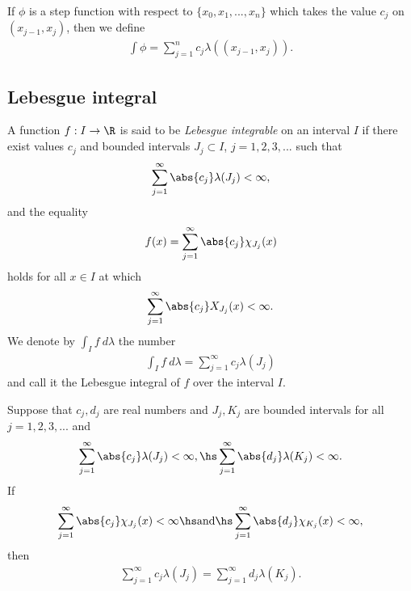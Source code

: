 \documentclass{article}
\begin{document}
\begin{definition}
	\label{step_integration}
	If $\phi$ is a step function with respect to $\{x_0, x_1, ..., x_n\}$ which takes the
	value $c_j$ on $(x_{j-1}, x_j)$, then we define
	\begin{align*}
		\int \phi = \sum_{j=1}^n c_j\lambda((x_{j-1},x_j)).
	\end{align*}
\end{definition}

\subsection{Lebesgue integral}

\begin{definition}
	\label{lebesgue}
	A function $f:I\to\R$ is said to be \emph{Lebesgue integrable} on an interval
	$I$ if there exist values $c_j$ and bounded intervals $J_j\subset I$, $j=1,2,3,...$
	such that
	\begin{align*}
		\sum_{j=1}^\infty \abs{c_j}\lambda (J_j) < \infty,
	\end{align*}
	and the equality
	\begin{align*}
		f(x) = \sum_{j=1}^\infty \abs{c_j}\chi_{J_j}(x)
	\end{align*}
	holds for all $x\in I$ at which
	\begin{align*}
		\sum_{j=1}^\infty \abs{c_j} X_{J_j}(x) < \infty.
	\end{align*}
	We denote by $\int_I f\:d\lambda$ the number
	\begin{align*}
		\int_I f\:d\lambda = \sum_{j=1}^\infty c_j\lambda(J_j)
	\end{align*}
	and call it the Lebesgue integral of $f$ over the interval $I$.
\end{definition}

\begin{theorem}[Notes 4.1]
	Suppose that $c_j,d_j$ are real numbers and $J_j,K_j$ are bounded intervals
	for all $j=1,2,3,...$ and
	\begin{align*}
		\sum_{j=1}^\infty \abs{c_j}\lambda(J_j)<\infty, \hs
		\sum_{j=1}^\infty \abs{d_j}\lambda(K_j)<\infty.
	\end{align*}
	If
	\begin{align*}
		\sum_{j=1}^\infty \abs{c_j}\chi_{J_j}(x) < \infty\hs\text{and}\hs
		\sum_{j=1}^\infty \abs{d_j}\chi_{K_j}(x) <\infty,
	\end{align*}
	then
	\begin{align*}
		\sum_{j=1}^\infty c_j\lambda(J_j)= \sum_{j=1}^\infty d_j\lambda(K_j).
	\end{align*}
\end{theorem}
\end{document}
